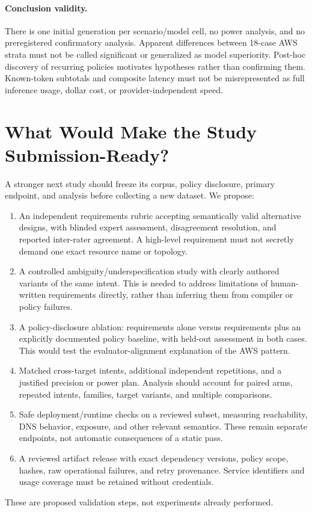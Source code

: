 \documentclass[11pt]{article}
\begin{document}
\paragraph{Conclusion validity.}
There is one initial generation per scenario/model cell, no power analysis, and
no preregistered confirmatory analysis. Apparent differences between 18-case AWS
strata must not be called significant or generalized as model superiority.
Post-hoc discovery of recurring policies motivates hypotheses rather than
confirming them. Known-token subtotals and composite latency must not be
misrepresented as full inference usage, dollar cost, or provider-independent speed.

\section{What Would Make the Study Submission-Ready?}
A stronger next study should freeze its corpus, policy disclosure, primary
endpoint, and analysis before collecting a new dataset. We propose:
\begin{enumerate}
  \item An independent requirements rubric accepting semantically valid alternative
  designs, with blinded expert assessment, disagreement resolution, and reported
  inter-rater agreement. A high-level requirement must not secretly demand one
  exact resource name or topology.
  \item A controlled ambiguity/underspecification study with clearly authored
  variants of the same intent. This is needed to address limitations of
  human-written requirements directly, rather than inferring them from compiler
  or policy failures.
  \item A policy-disclosure ablation: requirements alone versus requirements plus
  an explicitly documented policy baseline, with held-out assessment in both cases.
  This would test the evaluator-alignment explanation of the AWS pattern.
  \item Matched cross-target intents, additional independent repetitions, and a
  justified precision or power plan. Analysis should account for paired arms,
  repeated intents, families, target variants, and multiple comparisons.
  \item Safe deployment/runtime checks on a reviewed subset, measuring reachability,
  DNS behavior, exposure, and other relevant semantics. These remain separate
  endpoints, not automatic consequences of a static pass.
  \item A reviewed artifact release with exact dependency versions, policy scope,
  hashes, raw operational failures, and retry provenance. Service identifiers
  and usage coverage must be retained without credentials.
\end{enumerate}
These are proposed validation steps, not experiments already performed.
\end{document}
